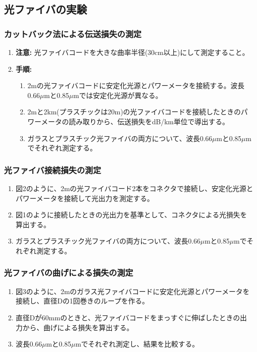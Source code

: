 \documentclass[a4paper,11pt,xelatex,ja=standard]{bxjsarticle}
\begin{document}
    \subsection{光ファイバの実験}
        \subsubsection{カットバック法による伝送損失の測定}
            \begin{enumerate}
                \item \textbf{注意:} 光ファイバコードを大きな曲率半径(30cm以上)にして測定すること。
                \item \textbf{手順:}
                \begin{enumerate}
                    \item 2mの光ファイバコードに安定化光源とパワーメータを接続する。波長0.66$\mu\text{m}$と0.85$\mu\text{m}$では安定化光源が異なる。
                    \item 2mと2km(プラスチックは20m)の光ファイバコードを接続したときのパワーメータの読み取りから、伝送損失をdB/km単位で導出する。
                    \item ガラスとプラスチック光ファイバの両方について、波長0.66$\mu\text{m}$と0.85$\mu\text{m}$でそれぞれ測定する。
                \end{enumerate}
            \end{enumerate}

        \subsubsection{光ファイバ接続損失の測定}
            \begin{enumerate}
                \item 図2のように、2mの光ファイバコード2本をコネクタで接続し、安定化光源とパワーメータを接続して光出力を測定する。
                \item 図1のように接続したときの光出力を基準として、コネクタによる光損失を算出する。
                \item ガラスとプラスチック光ファイバの両方について、波長0.66$\mu\text{m}$と0.85$\mu\text{m}$でそれぞれ測定する。
            \end{enumerate}

        \subsubsection{光ファイバの曲げによる損失の測定}
            \begin{enumerate}
                \item 図3のように、2mのガラス光ファイバコードに安定化光源とパワーメータを接続し、直径Dの1回巻きのループを作る。
                \item 直径Dが60mmのときと、光ファイバコードをまっすぐに伸ばしたときの出力から、曲げによる損失を算出する。
                \item 波長0.66$\mu\text{m}$と0.85$\mu\text{m}$でそれぞれ測定し、結果を比較する。
            \end{enumerate}
\end{document}
